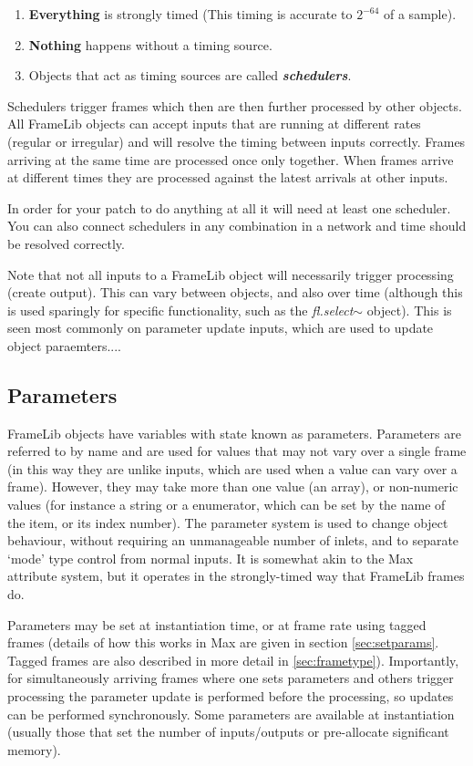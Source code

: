 \documentclass{article}
\newcommand{\flobject}[1]{\textit{fl.#1$\sim$}}
\begin{document}
 \begin{enumerate}
\item{\textbf{Everything} is strongly timed (This timing is accurate to $2^{-64}$ of a sample).}
\item{\textbf{Nothing} happens without a timing source.}
\item{Objects that act as timing sources are called \textbf{\textit{schedulers}}.}
 \end{enumerate}

Schedulers trigger frames which then are then further processed by other objects. All FrameLib objects can accept inputs that are running at different rates (regular or irregular) and will resolve the timing between inputs correctly. Frames arriving at the same time are processed once only together. When frames arrive at different times they are processed against the latest arrivals at other inputs.

In order for your patch to do anything at all it will need at least one scheduler. You can also connect schedulers in any combination in a network and time should be resolved correctly.

Note that not all inputs to a FrameLib object will necessarily trigger processing (create output). This can vary between objects, and also over time (although this is used sparingly for specific functionality, such as the \flobject{select} object). This is seen most commonly on parameter update inputs, which are used to update object paraemters....

\subsection{Parameters}

FrameLib objects have variables with state known as parameters. Parameters are referred to by name and are used for values that may not vary over a single frame  (in this way they are unlike inputs, which are used when a value can vary over a frame). However, they may take more than one value (an array), or non-numeric values (for instance a string or a enumerator, which can be set by the name of the item, or its index number). The parameter system is used to change object behaviour, without requiring an unmanageable number of inlets, and to separate `mode' type control from normal inputs. It is somewhat akin to the Max attribute system, but it operates in the strongly-timed way that FrameLib frames do.

Parameters may be set at instantiation time, or at frame rate using tagged frames (details of how this works in Max are given in section \ref{sec:setparams}. Tagged frames are also described in more detail in \ref{sec:frametype}). Importantly, for simultaneously arriving frames where one sets parameters and others trigger processing the parameter update is performed before the processing, so updates can be performed synchronously. Some parameters are available at instantiation (usually those that set the number of inputs/outputs or pre-allocate significant memory).
\end{document}
